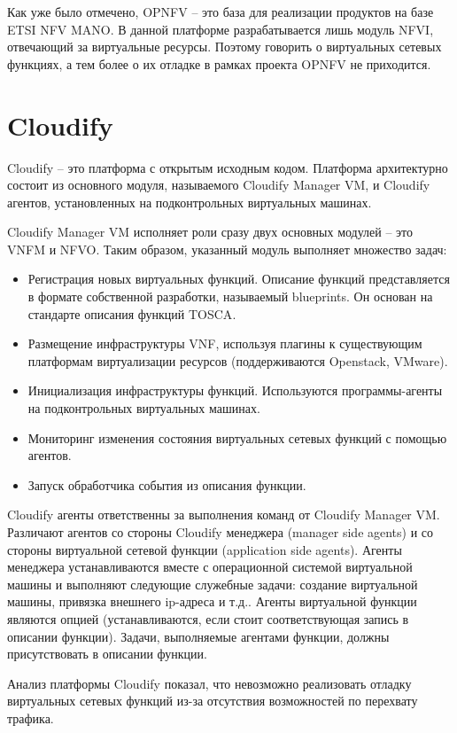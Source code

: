 \documentclass[oneside,final,14pt,a4paper]{extreport}
\begin{document}
Как уже было отмечено, OPNFV -- это база для реализации продуктов на базе ETSI NFV MANO. В данной платформе разрабатывается лишь модуль NFVI, отвечающий за виртуальные ресурсы. Поэтому говорить о виртуальных сетевых функциях, а тем более о их отладке в рамках проекта OPNFV не приходится.


\section{Cloudify}
Cloudify -- это платформа с открытым исходным кодом. Платформа архитектурно состоит из основного модуля, называемого Cloudify Manager VM, и Cloudify агентов, установленных на подконтрольных виртуальных машинах. 

Cloudify Manager VM исполняет роли сразу двух основных модулей -- это VNFM и NFVO. Таким образом, указанный модуль выполняет множество задач:
\begin{itemize}
	\item Регистрация новых виртуальных функций. Описание функций представляется в формате собственной разработки, называемый blueprints. Он основан на стандарте описания функций TOSCA\cite{bib:tosca}.
	\item Размещение инфраструктуры VNF, используя плагины к существующим платформам виртуализации ресурсов (поддерживаются Openstack, VMware).
	\item Инициализация инфраструктуры функций. Используются программы-агенты на подконтрольных виртуальных машинах.
	\item Мониторинг изменения состояния виртуальных сетевых функций с помощью агентов.
	\item Запуск обработчика события из описания функции.
\end{itemize}

Cloudify агенты ответственны за выполнения команд от Cloudify Manager VM. Различают агентов со стороны Cloudify менеджера (manager side agents) и со стороны виртуальной сетевой функции (application side agents). Агенты менеджера устанавливаются вместе с операционной системой виртуальной машины и выполняют следующие служебные задачи: создание виртуальной машины, привязка внешнего ip-адреса и т.д.. Агенты виртуальной функции являются опцией (устанавливаются, если стоит соответствующая запись в описании функции). Задачи, выполняемые агентами функции, должны присутствовать в описании функции.\cite{cloudify-official-oveview1}

Анализ платформы Cloudify показал, что невозможно реализовать отладку виртуальных сетевых функций из-за отсутствия возможностей по перехвату трафика. 
\end{document}
